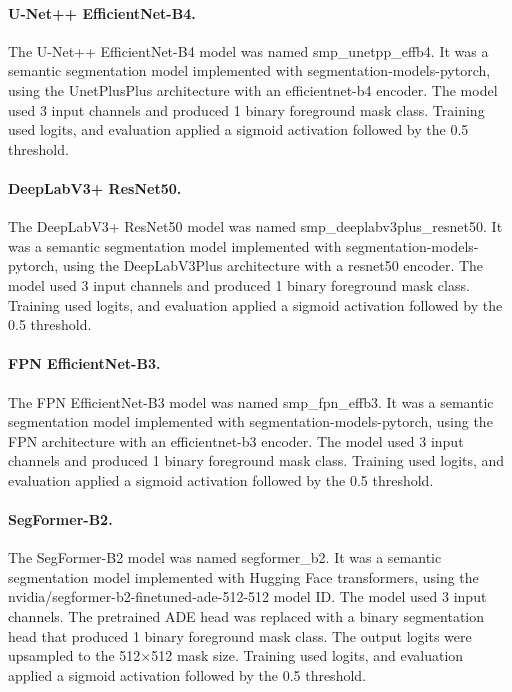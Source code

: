 \documentclass[11pt]{article}
\begin{document}
\paragraph{U-Net++ EfficientNet-B4.}
The U-Net++ EfficientNet-B4 model was named smp\_unetpp\_effb4. It was a semantic segmentation model implemented with segmentation-models-pytorch, using the UnetPlusPlus architecture with an efficientnet-b4 encoder. The model used 3 input channels and produced 1 binary foreground mask class. Training used logits, and evaluation applied a sigmoid activation followed by the 0.5 threshold.

\paragraph{DeepLabV3+ ResNet50.}
The DeepLabV3+ ResNet50 model was named smp\_deeplabv3plus\_resnet50. It was a semantic segmentation model implemented with segmentation-models-pytorch, using the DeepLabV3Plus architecture with a resnet50 encoder. The model used 3 input channels and produced 1 binary foreground mask class. Training used logits, and evaluation applied a sigmoid activation followed by the 0.5 threshold.

\paragraph{FPN EfficientNet-B3.}
The FPN EfficientNet-B3 model was named smp\_fpn\_effb3. It was a semantic segmentation model implemented with segmentation-models-pytorch, using the FPN architecture with an efficientnet-b3 encoder. The model used 3 input channels and produced 1 binary foreground mask class. Training used logits, and evaluation applied a sigmoid activation followed by the 0.5 threshold.

\paragraph{SegFormer-B2.}
The SegFormer-B2 model was named segformer\_b2. It was a semantic segmentation model implemented with Hugging Face transformers, using the nvidia/segformer-b2-finetuned-ade-512-512 model ID. The model used 3 input channels. The pretrained ADE head was replaced with a binary segmentation head that produced 1 binary foreground mask class. The output logits were upsampled to the 512$\times$512 mask size. Training used logits, and evaluation applied a sigmoid activation followed by the 0.5 threshold.
\end{document}
